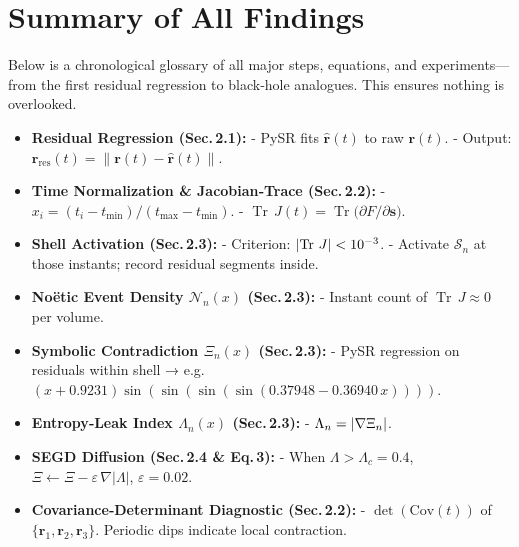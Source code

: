 \documentclass[11pt]{article}
\newcommand{\Shell}{\mathcal{S}}
\newcommand{\Contradiction}{\Xi}
\newcommand{\Noetic}{\mathcal{N}}
\newcommand{\Leak}{\Lambda}
\newcommand{\TrJ}{\operatorname{Tr}\,J}
\let\CustomAbs\abs
\begin{document}
\section{Summary of All Findings}

Below is a chronological glossary of all major steps, equations, and experiments—from the first residual regression to black‐hole analogues. This ensures nothing is overlooked.

\begin{itemize}[leftmargin=*]
  \item \textbf{Residual Regression (Sec.\,2.1):}  
    - PySR fits \(\hat{\bm r}(t)\) to raw \(\bm r(t)\).  
    - Output: \(\bm r_{\mathrm{res}}(t) = \lVert\bm r(t) - \hat{\bm r}(t)\rVert\).

  \item \textbf{Time Normalization \& Jacobian‐Trace (Sec.\,2.2):}  
    - \(x_i = (t_i - t_{\min}) / (t_{\max} - t_{\min})\).  
    - \(\TrJ(t) = \operatorname{Tr}\bigl(\partial F / \partial \bm s\bigr)\).

  \item \textbf{Shell Activation (Sec.\,2.3):}  
    - Criterion: \(\CustomAbs{\TrJ} < 10^{-3}\).  
    - Activate \(\Shell_n\) at those instants; record residual segments inside.

  \item \textbf{Noëtic Event Density \(\Noetic_n(x)\) (Sec.\,2.3):}  
    - Instant count of \(\TrJ \approx 0\) per volume.

  \item \textbf{Symbolic Contradiction \(\Contradiction_n(x)\) (Sec.\,2.3):}  
    - PySR regression on residuals within shell → e.g.\ \((x + 0.9231)\sin(\sin(\sin(\sin(0.37948 - 0.36940\,x))))\).

  \item \textbf{Entropy‐Leak Index \(\Leak_n(x)\) (Sec.\,2.3):}  
    - \(\Leak_n = \CustomAbs{\nabla \Contradiction_n}\).

  \item \textbf{SEGD Diffusion (Sec.\,2.4 \& Eq.\,3):}  
    - When \(\Leak > \Leak_c = 0.4\),  
      \(\Contradiction \leftarrow \Contradiction - \varepsilon\,\nabla \lvert \Leak\rvert\), \(\varepsilon = 0.02\).

  \item \textbf{Covariance‐Determinant Diagnostic (Sec.\,2.2):}  
    - \(\det(\mathrm{Cov}(t))\) of \(\{\bm r_1, \bm r_2, \bm r_3\}\). Periodic dips indicate local contraction.


\end{itemize}
\end{document}
